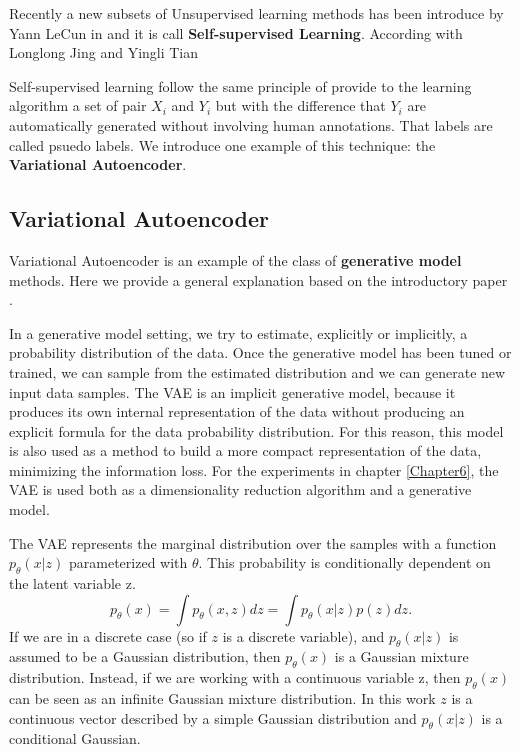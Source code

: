 Recently a new subsets of Unsupervised learning methods has been introduce by Yann LeCun in and it is call \textbf{Self-supervised Learning}. 
According with Longlong Jing and Yingli Tian \cite{jing2020self} 

Self-supervised learning follow the same principle of provide to the learning algorithm a set of pair $X_i$ and $Y_i$ but with the difference that $Y_i$  are automatically generated without involving human annotations. That labels are called psuedo labels.
We introduce one example of this technique: the \textbf{Variational Autoencoder}.

\subsection{Variational  Autoencoder}
Variational  Autoencoder is an example of the class of \textbf{generative model} methods.
Here we provide a general explanation based on the introductory paper \cite{kingma2019introduction}.

In a generative model setting, we try to estimate, explicitly or implicitly, a probability distribution of the data.
Once the generative model has been tuned or trained, we can sample from the estimated distribution and we can generate new input data samples.
The VAE is an implicit generative model, because it produces its own internal representation of the data without producing an explicit formula for the data probability distribution.
For this reason, this model is also used as a method to build a more compact representation of the data, minimizing the information loss.
For the experiments in chapter \ref{Chapter6}, the VAE is used both as a dimensionality reduction algorithm and a generative model.

The VAE represents the marginal distribution over the samples with a function $p_\theta(x|z)$ parameterized with $ \theta $.
This probability is conditionally dependent on the latent variable z.
\begin{equation*}
p_\theta(x) = \int p_\theta(x,z)dz =\int p_\theta(x |z) p(z)dz .
\end{equation*}If we are in a discrete case (so if $z$ is a discrete variable), and $p_\theta(x|z)$ is assumed to be a Gaussian distribution, then $p_\theta(x)$  is a Gaussian mixture distribution.
Instead, if we are working with a continuous variable z, then $p_\theta(x)$ can be seen as an infinite Gaussian mixture distribution.
In this work $z$ is a continuous vector described by a simple Gaussian distribution and $p_\theta(x|z)$ is a conditional Gaussian. 

